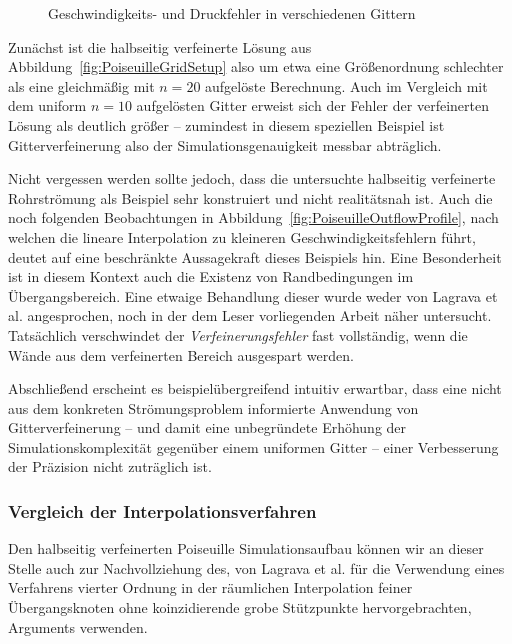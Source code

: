 \begin{figure}[h]
\centering

\caption{Geschwindigkeits- und Druckfehler in verschiedenen Gittern}
\label{fig:PoiseuilleErrorNorm}
\end{figure}

Zunächst ist die halbseitig verfeinerte Lösung aus Abbildung~\ref{fig:PoiseuilleGridSetup} also um etwa eine Größenordnung schlechter als eine gleichmäßig mit \(n=20\) aufgelöste Berechnung. Auch im Vergleich mit dem uniform \(n=10\) aufgelösten Gitter erweist sich der Fehler der verfeinerten Lösung als deutlich größer -- zumindest in diesem speziellen Beispiel ist Gitterverfeinerung also der Simulationsgenauigkeit messbar abträglich.

Nicht vergessen werden sollte jedoch, dass die untersuchte halbseitig verfeinerte Rohrströmung als Beispiel sehr konstruiert und nicht realitätsnah ist. Auch die noch folgenden Beobachtungen in Abbildung~\ref{fig:PoiseuilleOutflowProfile}, nach welchen die lineare Interpolation zu kleineren Geschwindigkeitsfehlern führt, deutet auf eine beschränkte Aussagekraft dieses Beispiels hin.
Eine Besonderheit ist in diesem Kontext auch die Existenz von Randbedingungen im Übergangsbereich. Eine etwaige Behandlung dieser wurde weder von Lagrava et al. angesprochen, noch in der dem Leser vorliegenden Arbeit näher untersucht. Tatsächlich verschwindet der \emph{Verfeinerungsfehler} fast vollständig, wenn die Wände aus dem verfeinerten Bereich ausgespart werden.

\bigskip

Abschließend erscheint es beispielübergreifend intuitiv erwartbar, dass eine nicht aus dem konkreten Strömungsproblem informierte Anwendung von Gitterverfeinerung -- und damit eine unbegründete Erhöhung der Simulationskomplexität gegenüber einem uniformen Gitter -- einer Verbesserung der Präzision nicht zuträglich ist.

\subsubsection{Vergleich der Interpolationsverfahren}

Den halbseitig verfeinerten Poiseuille Simulationsaufbau können wir an dieser Stelle auch zur Nachvollziehung des, von Lagrava et al. für die Verwendung eines Verfahrens vierter Ordnung in der räumlichen Interpolation feiner Übergangsknoten ohne koinzidierende grobe Stützpunkte hervorgebrachten, Arguments verwenden.


